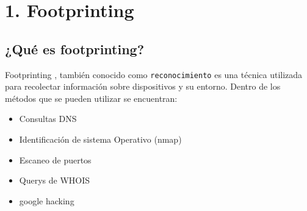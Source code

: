 %
% 
% 
% 








\tableofcontents
\newpage

\sectionfont{\scshape}


\section*{1. Footprinting}

\subsection*{¿Qué es footprinting?}

Footprinting \nocite{WikipediaFootprinting}, también conocido como \texttt{reconocimiento} es una técnica utilizada para recolectar información sobre dispositivos y su entorno. Dentro de los métodos que se pueden utilizar se encuentran:

\begin{itemize}
    \item Consultas DNS
    \item Identificación de sistema Operativo (nmap)
    \item Escaneo de puertos
    \item Querys de WHOIS
    \item google hacking
\end{itemize}

